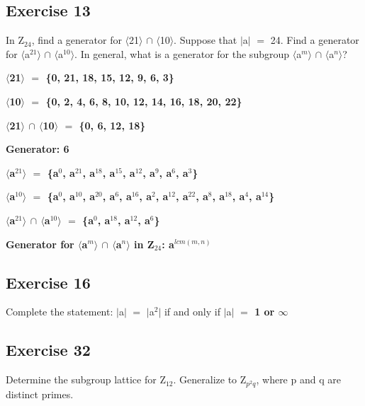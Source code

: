\documentclass{article}
\newcommand{\mt}[1]{\ensuremath{#1}}
\newcommand\ssc[2][\DefaultOpt]{%
  \def\DefaultOpt{#2}%
  \subsection[#1]{#2}%
}
\newcommand{\av}[1]{\mt{|}#1\mt{|}}  %
\newcommand{\bk}[1]{\{#1\}}
\newcommand{\abk}[1]{\mt{\langle}#1\mt{\rangle}}
\newcommand{\eql}{\mt{=} }
\newcommand{\uw}[2]{#1\mt{_{#2}}}
\newcommand{\uf}[2]{#1\mt{^{#2}}}
\newcommand{\infy}{\mt{\infty} }
\newcommand{\inn}{\mt{\cap} }
\begin{document}
\ssc{Exercise 13}{
	In \uw{Z}{24}, find a generator for \abk{21} \inn \abk{10}. Suppose that \av{a} \eql 24. Find a generator for \abk{\uf{a}{21}} \inn \abk{\uf{a}{10}}. In general, what is a generator for the subgroup \abk{\uf{a}{m}} \inn \abk{\uf{a}{n}}?
	
	\textbf{\abk{21} \eql \bk{0, 21, 18, 15, 12, 9, 6, 3}}
		
	\textbf{\abk{10} \eql \bk{0, 2, 4, 6, 8, 10, 12, 14, 16, 18, 20, 22}}
	
	\textbf{\abk{21} \inn \abk{10} \eql \bk{0, 6, 12, 18}}
	
	\textbf{Generator: 6}
	
	\textbf{\abk{\uf{a}{21}} \eql \bk{\uf{a}{0}, \uf{a}{21}, \uf{a}{18}, \uf{a}{15}, \uf{a}{12}, \uf{a}{9}, \uf{a}{6}, \uf{a}{3}}}
		
	\textbf{\abk{\uf{a}{10}} \eql \bk{\uf{a}{0}, \uf{a}{10}, \uf{a}{20}, \uf{a}{6}, \uf{a}{16}, \uf{a}{2}, \uf{a}{12}, \uf{a}{22}, \uf{a}{8}, \uf{a}{18}, \uf{a}{4}, \uf{a}{14}}}
	
	\textbf{\abk{\uf{a}{21}} \inn \abk{\uf{a}{10}} \eql \bk{\uf{a}{0}, \uf{a}{18}, \uf{a}{12},  \uf{a}{6}}}
		
	\textbf{Generator for \abk{\uf{a}{m}} \inn \abk{\uf{a}{n}} in \uw{Z}{24}: \uf{a}{lcm(m, n)}}
}

\ssc{Exercise 16}{
	Complete the statement: \av{a} \eql \av{\uf{a}{2}} if and only if \av{a} \textbf{\eql 1 or \infy}
}

\ssc{Exercise 32}{
	Determine the subgroup lattice for \uw{Z}{12}. Generalize to \uw{Z}{\uf{p}{2}q}, where p and q are distinct primes.
}
\end{document}
